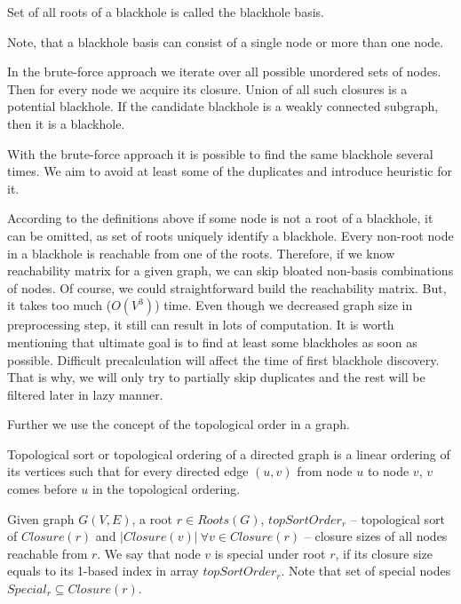 \documentclass{svproc}
\begin{document}
\begin{definition}
Set of all roots of a blackhole is called the blackhole basis.
\end{definition}

Note, that a blackhole basis can consist of a single node or more than one node. 

In the brute-force approach we iterate over all possible unordered sets of nodes. 
Then for every node we acquire its closure. Union of all such closures is a potential blackhole.
If the candidate blackhole is a weakly connected subgraph, then it is a blackhole.

With the brute-force approach it is possible to find the same blackhole several times.
We aim to avoid at least some of the duplicates and introduce heuristic for it.

According to the definitions above if some node is not a root of a blackhole, it can be omitted, as set of roots uniquely identify a blackhole.
Every non-root node in a blackhole is reachable from one of the roots. Therefore, if we know reachability matrix for a given graph, we can skip bloated non-basis combinations of nodes. Of course, we could straightforward build the reachability matrix. But, it takes too much ($O(V^3)$) time. Even though we decreased graph size
in preprocessing step, it still can result in lots of computation. It is worth mentioning that ultimate goal is to find at least some blackholes as soon as possible. 
Difficult precalculation will affect the time of first blackhole discovery. That is why, we will only try to partially skip duplicates and the rest will
be filtered later in lazy manner.

Further we use the concept of the topological order in a graph.  

\begin{definition}
	Topological sort or topological ordering of a directed graph is a linear ordering of 
	its vertices such that for every directed edge $(u,v)$ from node $u$ to node $v$,
	$v$ comes before $u$ in the topological ordering.
\end{definition}

\begin{definition}
	Given graph $G(V, E)$, a root $r \in Roots(G)$, $topSortOrder_r$ -- topological sort of $Closure(r)$ and 
	$|Closure(v)|\ \forall v \in Closure(r)$ --
	closure sizes of all nodes reachable from $r$. We say that node $v$ is special under root $r$, if its closure size  equals to its 1-based index in array $topSortOrder_r$. Note that set of special nodes $Special_r \subseteq Closure(r)$.
\end{definition}
\end{document}
